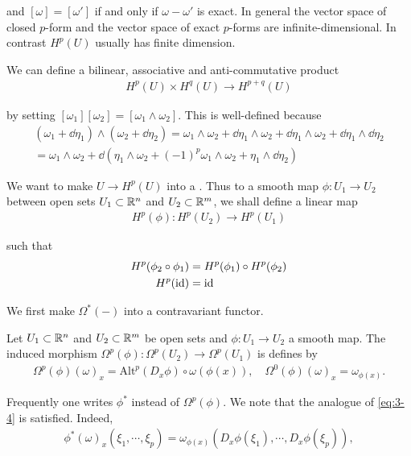 and $[\omega] = [\omega']$ if and only if $\omega-\omega'$ is exact. In general the vector space of closed 
$p$-form and the vector space of exact $p$-forms are infinite-dimensional. In contrast $H^p(U)$ usually has finite 
dimension.

We can define a bilinear, associative and anti-commutative product 
\begin{align}\label{eq:3-3}
  H^p(U)\times H^q(U)\to H^{p+q}(U)
\end{align}

by setting $[\omega_1][\omega_2] = [\omega_1\wedge\omega_2]$. This is well-defined because
\begin{align*}
  (\omega_1+\dd\eta_1)\wedge(\omega_2+\dd\eta_2)
  = \omega_1\wedge\omega_2 + \dd\eta_1\wedge\omega_2 + \dd\eta_1\wedge\omega_2 + \dd\eta_1\wedge\dd\eta_2 \\
  = \omega_1\wedge\omega_2 + \dd(\eta_1\wedge\omega_2 + (-1)^p\omega_1\wedge\omega_2 + \eta_1\wedge\dd\eta_2)
\end{align*}

We want to make $U\to H^p(U)$ into a . Thus to a smooth
map $\phi:U_1\to U_2$ between open sets $U_1\subset\mathbb{R}^n$ and $U_2\subset\mathbb{R}^m$, we shall define
a linear map
\begin{align*}
  H^p(\phi): H^p(U_2)\to H^p(U_1)
\end{align*}

such that 
\begin{align}\label{eq:3-4}
\begin{aligned}
  H^p(\phi_2\circ\phi_1) & = H^p(\phi_1)\circ H^p(\phi_2)\\
H^p(\operatorname{id}) & = \operatorname{id}
\end{aligned}
\end{align}

We first make $\Omega^*(-)$ into a contravariant functor.

\begin{definition}\label{def:3-10}
  Let $U_1\subset\mathbb{R}^n$ and $U_2\subset\mathbb{R}^m$ be open sets and $\phi:U_1\to U_2$ a 
  smooth map. The induced morphism $\Omega^p(\phi):\Omega^p(U_2)\to \Omega^p(U_1)$ is defines by 
  \begin{align*}
    \Omega^p(\phi)(\omega)_x=\mathrm{Alt}^p(D_x\phi)\circ\omega(\phi(x)),\quad\Omega^0(\phi)(\omega)_x=\omega_{\phi(x)}.    
  \end{align*}
\end{definition}

Frequently one writes $\phi^*$ instead of $\Omega^p(\phi)$. We note that the analogue of \eqref{eq:3-4} is 
satisfied. Indeed,
\begin{align*}
  \phi^*(\omega)_x(\xi_1,\cdots,\xi_p)=\omega_{\phi(x)}(D_x\phi(\xi_1),\cdots,D_x\phi(\xi_p)),
\end{align*}

